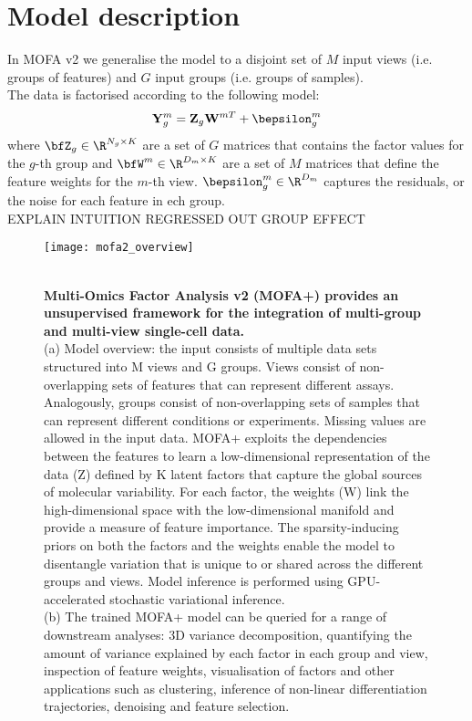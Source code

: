 \graphicspath{{Chapter4/Figs/simulations/}{Chapter4/Figs/scrna/}{Chapter4/Figs/scmet/}{Chapter4/Figs/scnmt/}}

\section{Model description}

In MOFA v2 we generalise the model to a disjoint set of $M$ input views (i.e. groups of features) and $G$ input groups (i.e. groups of samples).\\

The data is factorised according to the following model:
\begin{equation} \label{mofa_master_equation}
	\mathbf{Y}^{m}_{g} = \mathbf{Z}_{g} \mathbf{W}^{mT} + \bepsilon^{m}_{g}
\end{equation}
where  $\bfZ_{g} \in \R^{N_{g} \times K}$ are a set of $G$ matrices that contains the factor values for the $g$-th group and $\bfW^{m} \in \R^{D_m \times K}$ are a set of $M$ matrices that define the feature weights for the $m$-th view. $\bepsilon^{m}_{g} \in \R^{D_m}$ captures the residuals, or the noise for each feature in ech group.\\


EXPLAIN INTUITION
REGRESSED OUT GROUP EFFECT

\begin{figure}[H]
	\centering
	\texttt{[image: mofa2\_overview]}
	\caption[]{ \\
	\textbf{Multi-Omics Factor Analysis v2 (MOFA+) provides an unsupervised framework for the integration of multi-group and multi-view single-cell data.} \\
	(a) Model overview: the input consists of multiple data sets structured into M views and G groups. Views consist of non-overlapping sets of features that can represent different assays. Analogously, groups consist of non-overlapping sets of samples that can represent different conditions or experiments. Missing values are allowed in the input data. MOFA+ exploits the dependencies between the features to learn a low-dimensional representation of the data (Z) defined by K latent factors that capture the global sources of molecular variability. For each factor, the weights (W) link the high-dimensional space with the low-dimensional manifold and provide a measure of feature importance. The sparsity-inducing priors on both the factors and the weights enable the model to disentangle variation that is unique to or shared across the different groups and views. Model inference is performed using GPU-accelerated stochastic variational inference. \\
	(b) The trained MOFA+ model can be queried for a range of downstream analyses: 3D variance decomposition, quantifying the amount of variance explained by each factor in each group and view, inspection of feature weights, visualisation of factors and other applications such as clustering, inference of non-linear differentiation trajectories, denoising and feature selection.
	}
	\label{fig:mofa2_overview}
\end{figure}



